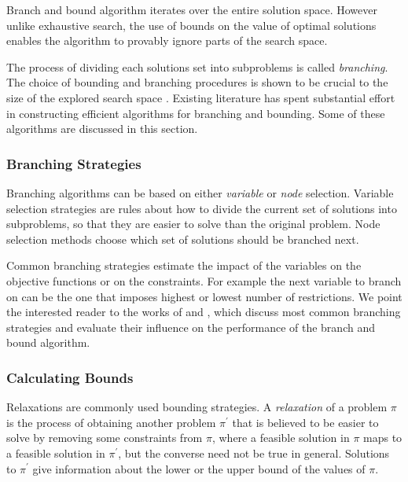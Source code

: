 \documentclass{mpaper}
\begin{document}

Branch and bound algorithm iterates over the entire solution space. However unlike exhaustive search, the use of bounds on the value of optimal solutions enables the algorithm to provably ignore parts of the search space.

The process of dividing each solutions set into subproblems is called \textit{branching}. The choice of bounding and branching procedures is shown to be crucial to the size of the explored search space \citep{Little63,Dantzig54, HeldK70}. Existing literature has spent substantial effort in constructing efficient algorithms for branching and bounding. Some of these algorithms are discussed in this section.

\subsubsection*{Branching Strategies}
Branching algorithms can be based on either \textit{variable} or \textit{node} selection. Variable selection strategies are rules about how to divide the current set of solutions into subproblems, so that they are easier to solve than the original problem. Node selection methods choose which set of solutions should be branched next.

Common branching strategies estimate the impact of the variables on the objective functions or on the constraints. For example the next variable to branch on can be the one that imposes highest or lowest number of restrictions.
We point the interested reader to the works of \citet{Atamturk2005} and \citet{Achterberg}, which discuss most common branching strategies and evaluate their influence on the performance of the branch and bound algorithm.

\subsubsection*{Calculating Bounds}
Relaxations are commonly used bounding strategies. A \textit{relaxation} of a problem $\pi$ is the process of obtaining another problem $\pi^\prime$ that is believed to be easier to solve by removing some constraints from $\pi$, where a feasible solution in $\pi$ maps to a feasible solution in $\pi^\prime$, but the converse need not be true in general. Solutions to $\pi^\prime$ give information about the lower or the upper bound of the values of $\pi$.
\end{document}
